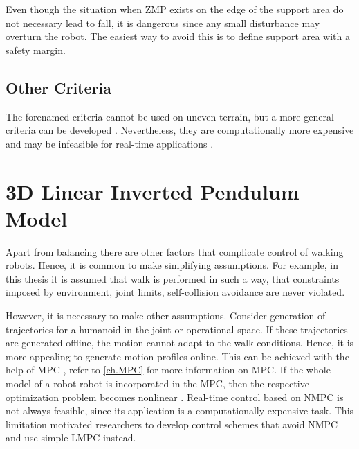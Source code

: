 Even though the situation when \ac{ZMP} exists on the edge of the support area do not
necessary lead to fall, it is dangerous since any small disturbance may overturn
the robot. The easiest way to avoid this is to define support area with a safety 
margin.


\subsection{Other Criteria}
The forenamed criteria cannot be used on uneven terrain, but a more general criteria
can be developed \cite{WieberStability, BretlEquilibrium, AdiosZMP}. Nevertheless,
they are computationally more expensive and may be infeasible for real-time applications
\cite{WieberStability}. 




\section{3D Linear Inverted Pendulum Model}\label{sec.3dlipm}
Apart from balancing there are other factors that complicate control of walking
robots. Hence, it is common to make simplifying assumptions. For example, in this
thesis it is assumed that walk is performed in such a way, that constraints 
imposed by environment, joint limits, self-collision avoidance are never violated.

However, it is necessary to make other assumptions. Consider generation of trajectories
for a humanoid in the joint or operational space. If these trajectories are generated
offline, the motion cannot adapt to the walk conditions. Hence, it is more appealing to 
generate motion profiles online. This can be achieved with the help of \ac{MPC} 
\cite{KajitaLegged}, refer to \cref{ch.MPC} for more information on \ac{MPC}. If the whole 
model of a robot robot is incorporated in the \ac{MPC}, then the respective optimization 
problem becomes nonlinear \cite{KajitaLegged}. Real-time control based on \ac{NMPC} is 
not always feasible, since its application is a computationally expensive task. This 
limitation motivated researchers to develop control schemes that avoid \ac{NMPC} and 
use simple \ac{LMPC} instead.

